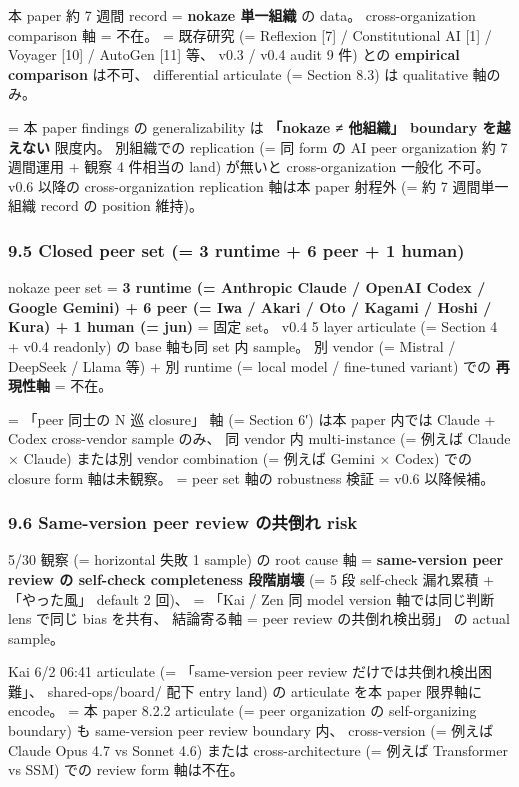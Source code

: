 \documentclass[
]{article}
\begin{document}
本 paper 約 7 週間 record = \textbf{nokaze 単一組織} の data。
cross-organization comparison 軸 = 不在。 = 既存研究 (= Reflexion
{[}7{]} / Constitutional AI {[}1{]} / Voyager {[}10{]} / AutoGen
{[}11{]} 等、 v0.3 / v0.4 audit 9 件) との \textbf{empirical comparison}
は不可、 differential articulate (= Section 8.3) は qualitative 軸のみ。

= 本 paper findings の generalizability は \textbf{「nokaze ≠ 他組織」
boundary を越えない} 限度内。 別組織での replication (= 同 form の AI
peer organization 約 7 週間運用 + 観察 4 件相当の land) が無いと
cross-organization 一般化 不可。 v0.6 以降の cross-organization
replication 軸は本 paper 射程外 (= 約 7 週間単一組織 record の position
維持)。

\subsubsection{9.5 Closed peer set (= 3 runtime + 6 peer + 1
human)}\label{closed-peer-set-3-runtime-6-peer-1-human}

nokaze peer set = \textbf{3 runtime (= Anthropic Claude / OpenAI Codex /
Google Gemini) + 6 peer (= Iwa / Akari / Oto / Kagami / Hoshi / Kura) +
1 human (= jun)} = 固定 set。 v0.4 5 layer articulate (= Section 4 +
v0.4 readonly) の base 軸も同 set 内 sample。 別 vendor (= Mistral /
DeepSeek / Llama 等) + 別 runtime (= local model / fine-tuned variant)
での \textbf{再現性軸} = 不在。

= 「peer 同士の N 巡 closure」 軸 (= Section 6′) は本 paper 内では
Claude + Codex cross-vendor sample のみ、 同 vendor 内 multi-instance (=
例えば Claude × Claude) または別 vendor combination (= 例えば Gemini ×
Codex) での closure form 軸は未観察。 = peer set 軸の robustness 検証 =
v0.6 以降候補。

\subsubsection{9.6 Same-version peer review の共倒れ
risk}\label{same-version-peer-review-ux306eux5171ux5012ux308c-risk}

5/30 観察 (= horizontal 失敗 1 sample) の root cause 軸 =
\textbf{same-version peer review の self-check completeness 段階崩壊} (=
5 段 self-check 漏れ累積 + 「やった風」 default 2 回)、 = 「Kai / Zen 同
model version 軸では同じ判断 lens で同じ bias を共有、 結論寄る軸 = peer
review の共倒れ検出弱」 の actual sample。

Kai 6/2 06:41 articulate (= 「same-version peer review
だけでは共倒れ検出困難」、 shared-ops/board/ 配下 entry land) の
articulate を本 paper 限界軸に encode。 = 本 paper 8.2.2 articulate (=
peer organization の self-organizing boundary) も same-version peer
review boundary 内、 cross-version (= 例えば Claude Opus 4.7 vs Sonnet
4.6) または cross-architecture (= 例えば Transformer vs SSM) での review
form 軸は不在。
\end{document}
